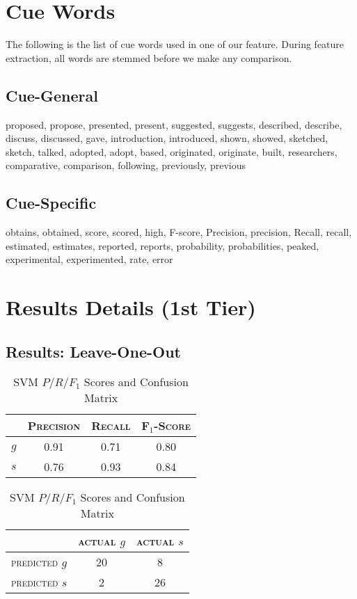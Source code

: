 \chapter{Cue Words}
\label{cuewords}
The following is the list of cue words used in one of our feature. During feature extraction, all words are stemmed before we make any comparison.
\section{Cue-General}
proposed, propose, presented, present, suggested, suggests, described, describe, discuss, discussed, gave, introduction, introduced, shown, showed, sketched, sketch, talked, adopted, adopt, based, originated, originate, built, researchers, comparative, comparison, following, previously, previous

\section{Cue-Specific}
obtains, obtained, score, scored, high, F-score, Precision, precision, Recall, recall, estimated, estimates, reported, reports, probability, probabilities, peaked, experimental, experimented, rate, error

\chapter{Results Details (1st Tier)}
\label{resultsdetails}
\section{Results: Leave-One-Out}
\begin{table}[ht]
\begin{minipage}[b]{0.45\linewidth}\centering
\begin{tabular}{ c | c  c  c }
	& \textsc{Precision} & \textsc{Recall} & \textsc{F$_1$-Score} \\
	\hline
	\textsc{$g$} 	& 0.91 & 0.71 & 0.80 \\
	\textsc{$s$}	& 0.76 & 0.93 & 0.84
\end{tabular}
\end{minipage}
\hspace{0.5cm}
\begin{minipage}[b]{0.45\linewidth}
\centering
\begin{tabular}{ c | c  c }
	 & \textsc{actual $g$} & \textsc{actual $s$} \\
	\hline
	\textsc{predicted $g$} 	& 20 & 8 \\
	\textsc{predicted $s$}		& 2 & 26
\end{tabular}
\end{minipage}
\caption{SVM $P/R/F_1$ Scores and Confusion Matrix}
\end{table}

